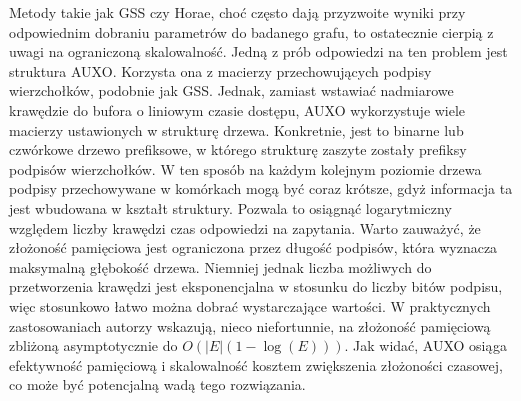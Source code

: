     Metody takie jak GSS czy Horae, choć często dają przyzwoite wyniki przy odpowiednim dobraniu parametrów do badanego grafu, to ostatecznie cierpią z uwagi na ograniczoną skalowalność. Jedną z prób odpowiedzi na ten problem jest struktura AUXO\cite{Jiang_Chen_Jin_2023}. Korzysta ona z macierzy przechowujących podpisy wierzchołków, podobnie jak GSS. Jednak, zamiast wstawiać nadmiarowe krawędzie do bufora o liniowym czasie dostępu, AUXO wykorzystuje wiele macierzy ustawionych w strukturę drzewa. Konkretnie, jest to binarne lub czwórkowe drzewo prefiksowe, w którego strukturę zaszyte zostały prefiksy podpisów wierzchołków. W ten sposób na każdym kolejnym poziomie drzewa podpisy przechowywane w komórkach mogą być coraz krótsze, gdyż informacja ta jest wbudowana w kształt struktury. Pozwala to osiągnąć logarytmiczny względem liczby krawędzi czas odpowiedzi na zapytania. Warto zauważyć, że złożoność pamięciowa jest ograniczona przez długość podpisów, która wyznacza maksymalną głębokość drzewa. Niemniej jednak liczba możliwych do przetworzenia krawędzi jest eksponencjalna w stosunku do liczby bitów podpisu, więc stosunkowo łatwo można dobrać wystarczające wartości. W praktycznych zastosowaniach autorzy wskazują, nieco niefortunnie, na złożoność pamięciową zbliżoną asymptotycznie do $O(|E|(1 - \log(E)))$. Jak widać, AUXO osiąga efektywność pamięciową i skalowalność kosztem zwiększenia złożoności czasowej, co może być potencjalną wadą tego rozwiązania.

